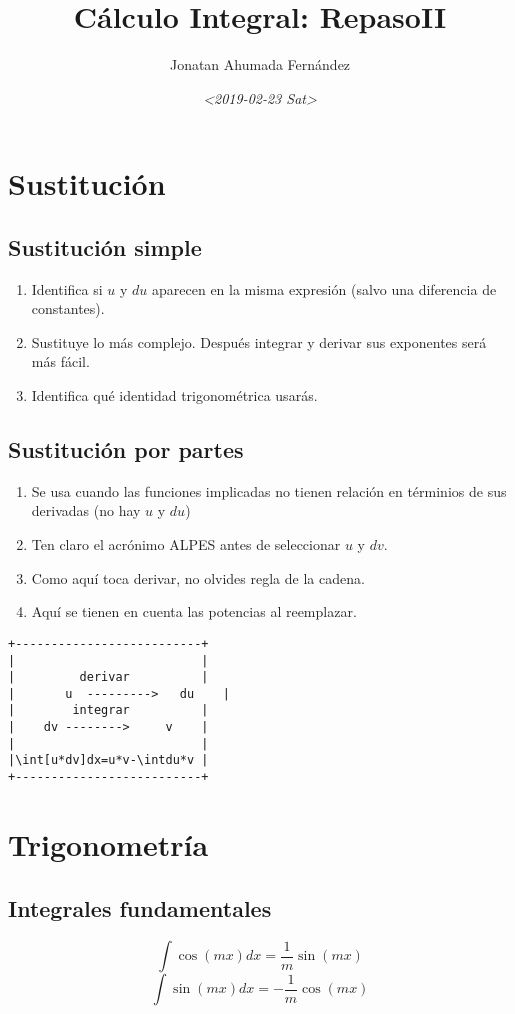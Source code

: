 \documentclass[11pt]{article}
\author{Jonatan Ahumada Fernández}
\date{\textit{<2019-02-23 Sat>}}
\title{Cálculo Integral: RepasoII}
\begin{document}
\maketitle
\tableofcontents


\section{Sustitución}
\label{sec-1}
\subsection{Sustitución simple}
\label{sec-1-1}
\begin{enumerate}
\item Identifica si \(u\) y \(du\) aparecen en la misma expresión (salvo una diferencia de constantes).
\item Sustituye lo más complejo. Después integrar y derivar sus exponentes será más fácil.
\item Identifica qué identidad trigonométrica usarás.
\end{enumerate}

\subsection{Sustitución por partes}
\label{sec-1-2}
\begin{enumerate}
\item Se usa cuando las funciones implicadas no tienen relación en términios de sus derivadas (no hay \(u\) y \(du\))
\item Ten claro el acrónimo ALPES antes de seleccionar \(u\) y \(dv\).
\item Como aquí toca derivar, no olvides regla de la cadena.
\item Aquí se tienen en cuenta las potencias al reemplazar.
\end{enumerate}


\begin{verbatim}
+--------------------------+
|                          |
|         derivar          |
|   	u  --------->   du    |
|        integrar          |
|    dv -------->     v    |
|                          |
|\int[u*dv]dx=u*v-\intdu*v |
+--------------------------+
\end{verbatim}
\section{Trigonometría}
\label{sec-2}
\subsection{Integrales fundamentales}
\label{sec-2-1}
\[\int \cos(mx)dx =  \frac{1}{m} \sin(mx)\]
\[\int \sin(mx)dx = - \frac{1}{m} \cos(mx)\]
\end{document}
